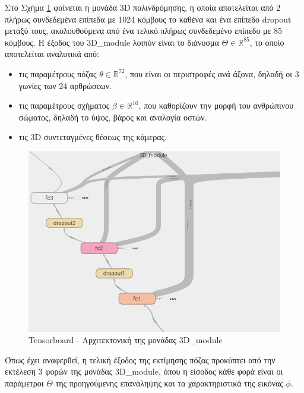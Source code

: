 Στο Σχήμα \ref{fig:3d_module} φαίνεται η μονάδα 3D παλινδρόμησης, η οποία αποτελείται από 2 πλήρως συνδεδεμένα επίπεδα με 1024 κόμβους το καθένα και ένα επίπεδο dropout μεταξύ τους, ακολουθούμενα από ένα τελικό πλήρως συνδεδεμένο επίπεδο με 85 κόμβους. Η έξοδος του 3D\_module λοιπόν είναι το διάνυσμα $\Theta \in \mathbb{R}^{85}$, το οποίο αποτελείται αναλυτικά από: 

\begin{itemize}
	\item τις παραμέτρους πόζας $\theta \in \mathbb{R}^{72}$, που είναι οι περιστροφές ανά άξονα, δηλαδή οι 3 γωνίες των 24 αρθρώσεων.
	\item τις παραμέτρους σχήματος $\beta \in \mathbb{R}^{10}$, που καθορίζουν την μορφή του ανθρώπινου σώματος, δηλαδή το ύψος, βάρος και αναλογία οστών.
	\item τις 3D συντεταγμένες θέσεως της κάμερας.
\end{itemize}

\begin{figure}[H]
	\centering
	\includegraphics[scale=0.5]{images/chapter3/3d_module.png}
	\caption{Tensorboard - Αρχιτεκτονική της μονάδας 3D\_module}
	\label{fig:3d_module}
\end{figure}

Όπως έχει αναφερθεί, η τελική έξοδος της εκτίμησης πόζας προκύπτει από την εκτέλεση 3 φορών της μονάδας 3D\_module, όπου η είσοδος κάθε φορά είναι οι παράμετροι $\Theta$ της προηγούμενης επανάληψης και τα χαρακτηριστικά της εικόνας $\phi$.